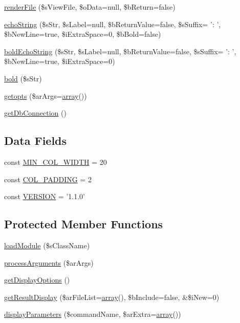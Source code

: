 \begin{DoxyCompactItemize}
\item 
\hyperlink{classCPSConsoleCommand_af9088b5fcf43bd1aafd2f2bccd952dbf}{renderFile} (\$sViewFile, \$oData=null, \$bReturn=false)
\item 
\hyperlink{classCPSConsoleCommand_ada6d688818556d18ca730d6db08126d0}{echoString} (\$sStr, \$sLabel=null, \$bReturnValue=false, \$sSuffix= ': ', \$bNewLine=true, \$iExtraSpace=0, \$bBold=false)
\item 
\hyperlink{classCPSConsoleCommand_a6a11a38d5810015be61ef7984ab418eb}{boldEchoString} (\$sStr, \$sLabel=null, \$bReturnValue=false, \$sSuffix= ': ', \$bNewLine=true, \$iExtraSpace=0)
\item 
\hyperlink{classCPSConsoleCommand_aaa50ba36c35f01c685fd00371b247b35}{bold} (\$sStr)
\item 
\hyperlink{classCPSConsoleCommand_a303f9f376ed603c5bd40deea781171ed}{getopts} (\$arArgs=\hyperlink{list_8php_aa3205d038c7f8feb5c9f01ac4dfadc88}{array}())
\item 
\hyperlink{classCPSConsoleCommand_a1cad0fdd11c50e747a10b8b23556e596}{getDbConnection} ()
\end{DoxyCompactItemize}
\subsection*{Data Fields}
\begin{DoxyCompactItemize}
\item 
const \hyperlink{classCPSConsoleCommand_a1004fff603687ed8b5826de7588fa252}{MIN\_\-COL\_\-WIDTH} = 20
\item 
const \hyperlink{classCPSConsoleCommand_a4b90a6cacaef1bfd7e10e14ea54905aa}{COL\_\-PADDING} = 2
\item 
const \hyperlink{classCPSConsoleCommand_af71005841ce53adac00581ab0ba24c1f}{VERSION} = '1.1.0'
\end{DoxyCompactItemize}
\subsection*{Protected Member Functions}
\begin{DoxyCompactItemize}
\item 
\hyperlink{classCPSConsoleCommand_a60623f320f2f14f828a4b24dc331f4f6}{loadModule} (\$sClassName)
\item 
\hyperlink{classCPSConsoleCommand_a886e39444aaa31abaf173a819b4be205}{processArguments} (\$arArgs)
\item 
\hyperlink{classCPSConsoleCommand_abf0b96b21351ca3f777c8d6c78535ffe}{getDisplayOptions} ()
\item 
\hyperlink{classCPSConsoleCommand_a330ea7ca53549b94a76544ae38e7e538}{getResultDisplay} (\$arFileList=\hyperlink{list_8php_aa3205d038c7f8feb5c9f01ac4dfadc88}{array}(), \$bInclude=false, \&\$iNew=0)
\item 
\hyperlink{classCPSConsoleCommand_a243b35d1b1d2d43971e40d1382536c31}{displayParameters} (\$commandName, \$arExtra=\hyperlink{list_8php_aa3205d038c7f8feb5c9f01ac4dfadc88}{array}())
\end{DoxyCompactItemize}
